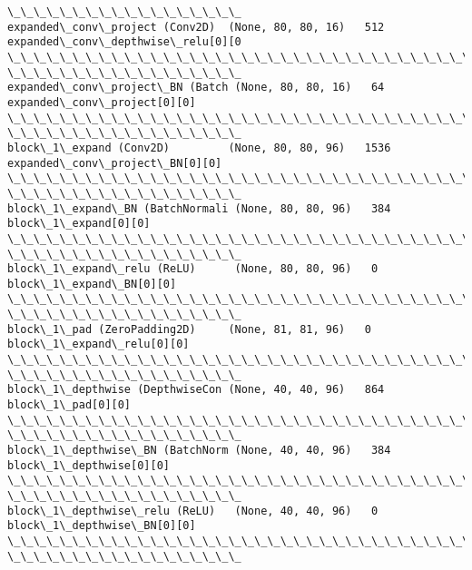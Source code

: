 \documentclass[11pt]{article}
\begin{document}
\begin{Verbatim}[commandchars=\\\{\}]
\_\_\_\_\_\_\_\_\_\_\_\_\_\_\_\_\_\_
expanded\_conv\_project (Conv2D)  (None, 80, 80, 16)   512
expanded\_conv\_depthwise\_relu[0][0
\_\_\_\_\_\_\_\_\_\_\_\_\_\_\_\_\_\_\_\_\_\_\_\_\_\_\_\_\_\_\_\_\_\_\_\_\_\_\_\_\_\_\_\_\_\_\_\_\_\_\_\_\_\_\_\_\_\_\_\_\_\_\_\_\_\_\_\_\_\_\_\_\_\_\_\_\_\_\_\_
\_\_\_\_\_\_\_\_\_\_\_\_\_\_\_\_\_\_
expanded\_conv\_project\_BN (Batch (None, 80, 80, 16)   64
expanded\_conv\_project[0][0]
\_\_\_\_\_\_\_\_\_\_\_\_\_\_\_\_\_\_\_\_\_\_\_\_\_\_\_\_\_\_\_\_\_\_\_\_\_\_\_\_\_\_\_\_\_\_\_\_\_\_\_\_\_\_\_\_\_\_\_\_\_\_\_\_\_\_\_\_\_\_\_\_\_\_\_\_\_\_\_\_
\_\_\_\_\_\_\_\_\_\_\_\_\_\_\_\_\_\_
block\_1\_expand (Conv2D)         (None, 80, 80, 96)   1536
expanded\_conv\_project\_BN[0][0]
\_\_\_\_\_\_\_\_\_\_\_\_\_\_\_\_\_\_\_\_\_\_\_\_\_\_\_\_\_\_\_\_\_\_\_\_\_\_\_\_\_\_\_\_\_\_\_\_\_\_\_\_\_\_\_\_\_\_\_\_\_\_\_\_\_\_\_\_\_\_\_\_\_\_\_\_\_\_\_\_
\_\_\_\_\_\_\_\_\_\_\_\_\_\_\_\_\_\_
block\_1\_expand\_BN (BatchNormali (None, 80, 80, 96)   384
block\_1\_expand[0][0]
\_\_\_\_\_\_\_\_\_\_\_\_\_\_\_\_\_\_\_\_\_\_\_\_\_\_\_\_\_\_\_\_\_\_\_\_\_\_\_\_\_\_\_\_\_\_\_\_\_\_\_\_\_\_\_\_\_\_\_\_\_\_\_\_\_\_\_\_\_\_\_\_\_\_\_\_\_\_\_\_
\_\_\_\_\_\_\_\_\_\_\_\_\_\_\_\_\_\_
block\_1\_expand\_relu (ReLU)      (None, 80, 80, 96)   0
block\_1\_expand\_BN[0][0]
\_\_\_\_\_\_\_\_\_\_\_\_\_\_\_\_\_\_\_\_\_\_\_\_\_\_\_\_\_\_\_\_\_\_\_\_\_\_\_\_\_\_\_\_\_\_\_\_\_\_\_\_\_\_\_\_\_\_\_\_\_\_\_\_\_\_\_\_\_\_\_\_\_\_\_\_\_\_\_\_
\_\_\_\_\_\_\_\_\_\_\_\_\_\_\_\_\_\_
block\_1\_pad (ZeroPadding2D)     (None, 81, 81, 96)   0
block\_1\_expand\_relu[0][0]
\_\_\_\_\_\_\_\_\_\_\_\_\_\_\_\_\_\_\_\_\_\_\_\_\_\_\_\_\_\_\_\_\_\_\_\_\_\_\_\_\_\_\_\_\_\_\_\_\_\_\_\_\_\_\_\_\_\_\_\_\_\_\_\_\_\_\_\_\_\_\_\_\_\_\_\_\_\_\_\_
\_\_\_\_\_\_\_\_\_\_\_\_\_\_\_\_\_\_
block\_1\_depthwise (DepthwiseCon (None, 40, 40, 96)   864
block\_1\_pad[0][0]
\_\_\_\_\_\_\_\_\_\_\_\_\_\_\_\_\_\_\_\_\_\_\_\_\_\_\_\_\_\_\_\_\_\_\_\_\_\_\_\_\_\_\_\_\_\_\_\_\_\_\_\_\_\_\_\_\_\_\_\_\_\_\_\_\_\_\_\_\_\_\_\_\_\_\_\_\_\_\_\_
\_\_\_\_\_\_\_\_\_\_\_\_\_\_\_\_\_\_
block\_1\_depthwise\_BN (BatchNorm (None, 40, 40, 96)   384
block\_1\_depthwise[0][0]
\_\_\_\_\_\_\_\_\_\_\_\_\_\_\_\_\_\_\_\_\_\_\_\_\_\_\_\_\_\_\_\_\_\_\_\_\_\_\_\_\_\_\_\_\_\_\_\_\_\_\_\_\_\_\_\_\_\_\_\_\_\_\_\_\_\_\_\_\_\_\_\_\_\_\_\_\_\_\_\_
\_\_\_\_\_\_\_\_\_\_\_\_\_\_\_\_\_\_
block\_1\_depthwise\_relu (ReLU)   (None, 40, 40, 96)   0
block\_1\_depthwise\_BN[0][0]
\_\_\_\_\_\_\_\_\_\_\_\_\_\_\_\_\_\_\_\_\_\_\_\_\_\_\_\_\_\_\_\_\_\_\_\_\_\_\_\_\_\_\_\_\_\_\_\_\_\_\_\_\_\_\_\_\_\_\_\_\_\_\_\_\_\_\_\_\_\_\_\_\_\_\_\_\_\_\_\_
\_\_\_\_\_\_\_\_\_\_\_\_\_\_\_\_\_\_

\end{Verbatim}
\end{document}

